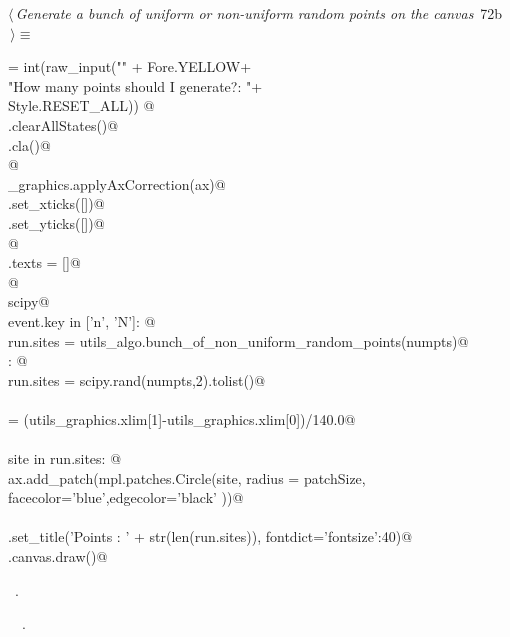 \documentclass[11.5pt]{report}
\begin{document}
\begin{flushleft} \small\label{scrap107}\raggedright\small
{} $\langle\,${\itshape Generate a bunch of uniform or non-uniform random points on the canvas}\nobreak\ {\footnotesize {72b}}$\,\rangle\equiv$
\vspace{-1ex}
\begin{list}{}{} \item
\mbox{}\verb@numpts = int(raw_input("\n" + Fore.YELLOW+\@\\
\mbox{}\verb@                       "How many points should I generate?: "+\@\\
\mbox{}\verb@                       Style.RESET_ALL)) @\\
\mbox{}\verb@run.clearAllStates()@\\
\mbox{}\verb@ax.cla()@\\
\mbox{}\verb@               @\\
\mbox{}\verb@utils_graphics.applyAxCorrection(ax)@\\
\mbox{}\verb@ax.set_xticks([])@\\
\mbox{}\verb@ax.set_yticks([])@\\
\mbox{}\verb@                @\\
\mbox{}\verb@fig.texts = []@\\
\mbox{}\verb@                 @\\
\mbox{}\verb@import scipy@\\
\mbox{}\verb@if event.key in ['n', 'N']: @\\
\mbox{}\verb@        run.sites = utils_algo.bunch_of_non_uniform_random_points(numpts)@\\
\mbox{}\verb@else : @\\
\mbox{}\verb@        run.sites = scipy.rand(numpts,2).tolist()@\\
\mbox{}\verb@@\\
\mbox{}\verb@patchSize  = (utils_graphics.xlim[1]-utils_graphics.xlim[0])/140.0@\\
\mbox{}\verb@@\\
\mbox{}\verb@for site in run.sites:      @\\
\mbox{}\verb@    ax.add_patch(mpl.patches.Circle(site, radius = patchSize, \@\\
\mbox{}\verb@                 facecolor='blue',edgecolor='black' ))@\\
\mbox{}\verb@@\\
\mbox{}\verb@ax.set_title('Points : ' + str(len(run.sites)), fontdict={'fontsize':40})@\\
\mbox{}\verb@fig.canvas.draw()@\\
\mbox{}\verb@@{\NWsep}
\end{list}
\vspace{-1.5ex}
\footnotesize
\begin{list}{}{\setlength{\itemsep}{-\parsep}\setlength{\itemindent}{-\leftmargin}}
\item \NWtxtMacroRefIn\ .
\item \NWtxtIdentsUsed\nobreak\  \verb@clearAllStates@\nobreak\ .
\item{}
\end{list}
\vspace{4ex}
\end{flushleft}
\end{document}
